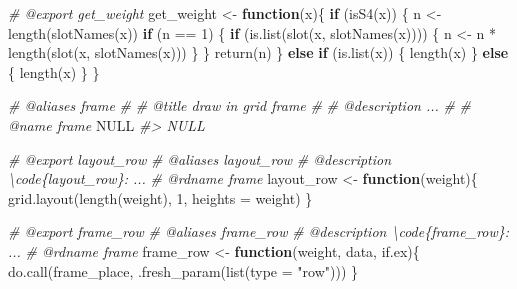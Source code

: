 \documentclass[
]{article}
\newenvironment{Shaded}{\begin{snugshade}}{\end{snugshade}}
\newcommand{\AttributeTok}[1]{\textcolor[rgb]{0.77,0.63,0.00}{#1}}
\newcommand{\CommentTok}[1]{\textcolor[rgb]{0.56,0.35,0.01}{\textit{#1}}}
\newcommand{\ConstantTok}[1]{\textcolor[rgb]{0.00,0.00,0.00}{#1}}
\newcommand{\ControlFlowTok}[1]{\textcolor[rgb]{0.13,0.29,0.53}{\textbf{#1}}}
\newcommand{\DecValTok}[1]{\textcolor[rgb]{0.00,0.00,0.81}{#1}}
\newcommand{\FunctionTok}[1]{\textcolor[rgb]{0.00,0.00,0.00}{#1}}
\newcommand{\NormalTok}[1]{#1}
\newcommand{\OtherTok}[1]{\textcolor[rgb]{0.56,0.35,0.01}{#1}}
\newcommand{\SpecialCharTok}[1]{\textcolor[rgb]{0.00,0.00,0.00}{#1}}
\newcommand{\StringTok}[1]{\textcolor[rgb]{0.31,0.60,0.02}{#1}}
\begin{document}
\begin{Shaded}
\begin{Highlighting}[]
\CommentTok{\#\textquotesingle{} @export get\_weight}
\NormalTok{get\_weight }\OtherTok{\textless{}{-}} \ControlFlowTok{function}\NormalTok{(x)\{}
  \ControlFlowTok{if}\NormalTok{ (}\FunctionTok{isS4}\NormalTok{(x)) \{}
\NormalTok{    n }\OtherTok{\textless{}{-}} \FunctionTok{length}\NormalTok{(}\FunctionTok{slotNames}\NormalTok{(x))}
    \ControlFlowTok{if}\NormalTok{ (n }\SpecialCharTok{==} \DecValTok{1}\NormalTok{) \{}
      \ControlFlowTok{if}\NormalTok{ (}\FunctionTok{is.list}\NormalTok{(}\FunctionTok{slot}\NormalTok{(x, }\FunctionTok{slotNames}\NormalTok{(x)))) \{}
\NormalTok{        n }\OtherTok{\textless{}{-}}\NormalTok{ n }\SpecialCharTok{*} \FunctionTok{length}\NormalTok{(}\FunctionTok{slot}\NormalTok{(x, }\FunctionTok{slotNames}\NormalTok{(x)))}
\NormalTok{      \}}
\NormalTok{    \}}
    \FunctionTok{return}\NormalTok{(n)}
\NormalTok{  \} }\ControlFlowTok{else} \ControlFlowTok{if}\NormalTok{ (}\FunctionTok{is.list}\NormalTok{(x)) \{}
    \FunctionTok{length}\NormalTok{(x)}
\NormalTok{  \} }\ControlFlowTok{else}\NormalTok{ \{}
    \FunctionTok{length}\NormalTok{(x)}
\NormalTok{  \}}
\NormalTok{\}}

\CommentTok{\#\textquotesingle{} @aliases frame}
\CommentTok{\#\textquotesingle{}}
\CommentTok{\#\textquotesingle{} @title draw in grid frame}
\CommentTok{\#\textquotesingle{}}
\CommentTok{\#\textquotesingle{} @description ...}
\CommentTok{\#\textquotesingle{}}
\CommentTok{\#\textquotesingle{} @name frame}
\ConstantTok{NULL}
\CommentTok{\#\textgreater{} NULL}

\CommentTok{\#\textquotesingle{} @export layout\_row}
\CommentTok{\#\textquotesingle{} @aliases layout\_row}
\CommentTok{\#\textquotesingle{} @description \textbackslash{}code\{layout\_row\}: ...}
\CommentTok{\#\textquotesingle{} @rdname frame}
\NormalTok{layout\_row }\OtherTok{\textless{}{-}} \ControlFlowTok{function}\NormalTok{(weight)\{}
  \FunctionTok{grid.layout}\NormalTok{(}\FunctionTok{length}\NormalTok{(weight), }\DecValTok{1}\NormalTok{, }\AttributeTok{heights =}\NormalTok{ weight)}
\NormalTok{\}}

\CommentTok{\#\textquotesingle{} @export frame\_row}
\CommentTok{\#\textquotesingle{} @aliases frame\_row}
\CommentTok{\#\textquotesingle{} @description \textbackslash{}code\{frame\_row\}: ...}
\CommentTok{\#\textquotesingle{} @rdname frame}
\NormalTok{frame\_row }\OtherTok{\textless{}{-}} \ControlFlowTok{function}\NormalTok{(weight, data, if.ex)\{}
  \FunctionTok{do.call}\NormalTok{(frame\_place, }\FunctionTok{.fresh\_param}\NormalTok{(}\FunctionTok{list}\NormalTok{(}\AttributeTok{type =} \StringTok{"row"}\NormalTok{)))}
\NormalTok{\}}


\end{Highlighting}
\end{Shaded}
\end{document}
